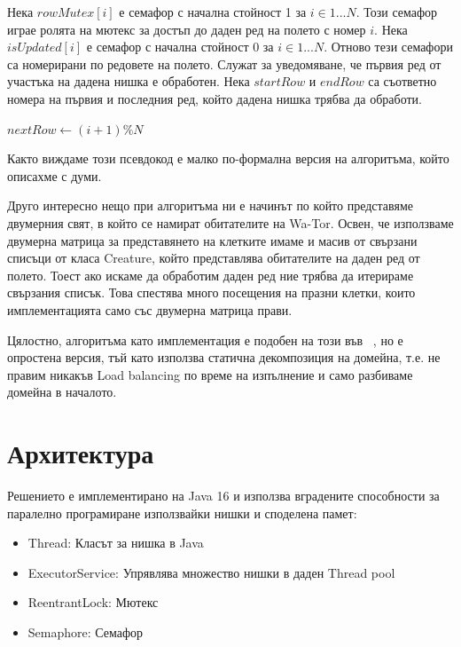 \documentclass{article}
\begin{document}
Нека $rowMutex[i]$ е семафор с начална стойност 1 за $i \in 1...N$.
Този семафор играе ролята на мютекс за достъп до даден ред на полето с номер $i$.
Нека $isUpdated[i]$ е семафор с начална стойност 0 за $i \in 1...N$.
Отново тези семафори са номерирани по редовете на полето. Служат за уведомяване,
че първия ред от участъка на дадена нишка е обработен.
Нека $startRow$ и $endRow$ са съответно номера на първия и последния ред,
който дадена нишка трябва да обработи.
\bigbreak
\begin{algorithmic}
	\State $nextRow\gets (i + 1) \% N$
		\State {}
		\State {}
		\State {}
	\EndIf

	\State {}

		\State {}
		\State {}
		\State {}
	\EndIf
\EndFor
\end{algorithmic}
\bigbreak
Както виждаме този псевдокод е малко по-формална версия на алгоритъма, който описахме с думи.

Друго интересно нещо при алгоритъма ни е начинът по който представяме двумерния свят, в който се намират
обитателите на Wa-Tor. Освен, че използваме двумерна матрица за представянето на клетките
имаме и масив от свързани списъци от класа Creature, който представлява обитателите на даден
ред от полето. Тоест ако искаме да обработим даден ред ние трябва да итерираме свързания списък.
Това спестява много посещения на празни клетки, които имплементацията само със двумерна матрица прави.

Цялостно, алгоритъма като имплементация е подобен на този във ~\cite{bounded_neighbours}, но е опростена
версия, тъй като използва статична декомпозиция на домейна, т.е. не правим никакъв Load balancing
по време на изпълнение и само разбиваме домейна в началото.

\newpage

\section{Архитектура}
Решението е имплементирано на Java 16 и използва вградените способности за паралелно програмиране
използвайки нишки и споделена памет:
\begin{itemize}
	\item Thread: Класът за нишка в Java
	\item ExecutorService: Упрявлява множество нишки в даден Thread pool
	\item ReentrantLock: Мютекс
	\item Semaphore: Семафор
\end{itemize}
\end{document}
